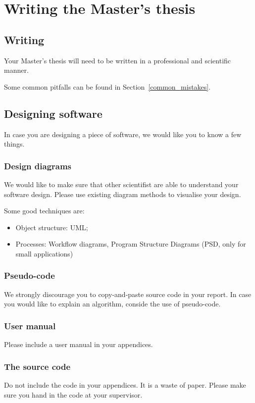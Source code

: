 \documentclass{latex-format/stylesheets/BEMNextstyle}
\begin{document}
\section*{Writing the Master's thesis}
\subsection*{Writing}
Your Master's thesis will need to be written in a professional and scientific manner.

Some common pitfalls can be found in Section~\ref{common_mistakes}.

\subsection*{Designing software}
In case you are designing a piece of software, we would like you to know a few things.

\subsubsection*{Design diagrams}
We would like to make sure that other scientifist are able to understand your software design. Please use existing diagram methods to visualise your design.

Some good techniques are:
\begin{itemize}
\item Object structure: UML;
\item Processes: Workflow diagrams, Program Structure Diagrams (PSD, only for small applications)
\end{itemize}

\subsubsection*{Pseudo-code}
We strongly discourage you to copy-and-paste source code in your report. In case you would like to explain an algorithm, conside the use of pseudo-code.

\subsubsection*{User manual}
Please include a user manual in your appendices.

\subsubsection*{The source code}
Do not include the code in your appendices. It is a waste of paper. Please make sure you hand in the code at your supervisor.
\end{document}
